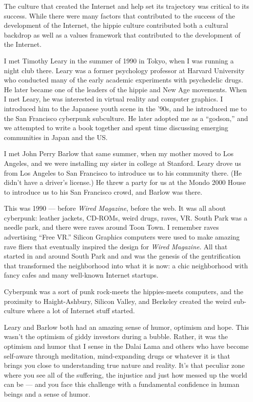 The culture that created the Internet and help set its trajectory was critical to its success. While there were many factors that contributed to the success of the development of the Internet, the hippie culture contributed both a cultural backdrop as well as a values framework that contributed to the development of the Internet.

I met Timothy Leary in the summer of 1990 in Tokyo, when I was running a night club there. Leary was a former psychology professor at Harvard University who conducted many of the early academic experiments with psychedelic drugs. He later became one of the leaders of the hippie and New Age movements. When I met Leary, he was interested in virtual reality and computer graphics. I introduced him to the Japanese youth scene in the '90s, and he introduced me to the San Francisco cyberpunk subculture. He later adopted me as a ``godson,'' and we attempted to write a book together and spent time discussing emerging communities in Japan and the US.

I met John Perry Barlow that same summer, when my mother moved to Los Angeles, and we were installing my sister in college at Stanford. Leary drove us from Los Angeles to San Francisco to introduce us to his community there. (He didn't have a driver's license.) He threw a party for us at the Mondo 2000 House to introduce us to his San Francisco crowd, and Barlow was there.
 
This was 1990 --- before \textit{Wired Magazine}, before the web. It was all about cyberpunk: leather jackets, CD-ROMs, weird drugs, raves, VR. South Park was a needle park, and there were raves around Toon Town. I remember raves advertising ``Free VR.'' Silicon Graphics computers were used to make amazing rave fliers that eventually inspired the design for \emph{Wired Magazine}. All that started in and around South Park and and was the genesis of the gentrification that transformed the neighborhood into what it is now: a chic neighborhood with fancy cafes and many well-known Internet startups.

Cyberpunk was a sort of punk rock-meets the hippies-meets computers, and the proximity to Haight-Ashbury, Silicon Valley, and Berkeley created the weird sub-culture where a lot of Internet stuff started.
 
Leary and Barlow both had an amazing sense of humor, optimism and hope. This wasn't the optimism of giddy investors during a bubble. Rather, it was the optimism and humor that I sense in the Dalai Lama and others who have become self-aware through meditation, mind-expanding drugs or whatever it is that brings you close to understanding true nature and reality. It's that peculiar zone where you see all of the suffering, the injustice and just how messed up the world can be --- and you face this challenge with a fundamental confidence in human beings and a sense of humor.

